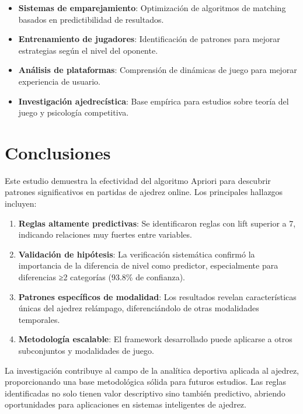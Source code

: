 \documentclass[runningheads]{llncs}
\begin{document}
\begin{itemize}
\item \textbf{Sistemas de emparejamiento}: Optimización de algoritmos de matching basados en predictibilidad de resultados.

\item \textbf{Entrenamiento de jugadores}: Identificación de patrones para mejorar estrategias según el nivel del oponente.

\item \textbf{Análisis de plataformas}: Comprensión de dinámicas de juego para mejorar experiencia de usuario.

\item \textbf{Investigación ajedrecística}: Base empírica para estudios sobre teoría del juego y psicología competitiva.
\end{itemize}

\section{Conclusiones}

Este estudio demuestra la efectividad del algoritmo Apriori para descubrir patrones significativos en partidas de ajedrez online. Los principales hallazgos incluyen:

\begin{enumerate}
\item \textbf{Reglas altamente predictivas}: Se identificaron reglas con lift superior a 7, indicando relaciones muy fuertes entre variables.

\item \textbf{Validación de hipótesis}: La verificación sistemática confirmó la importancia de la diferencia de nivel como predictor, especialmente para diferencias ≥2 categorías (93.8\% de confianza).

\item \textbf{Patrones específicos de modalidad}: Los resultados revelan características únicas del ajedrez relámpago, diferenciándolo de otras modalidades temporales.

\item \textbf{Metodología escalable}: El framework desarrollado puede aplicarse a otros subconjuntos y modalidades de juego.
\end{enumerate}

La investigación contribuye al campo de la analítica deportiva aplicada al ajedrez, proporcionando una base metodológica sólida para futuros estudios. Las reglas identificadas no solo tienen valor descriptivo sino también predictivo, abriendo oportunidades para aplicaciones en sistemas inteligentes de ajedrez.
\end{document}
